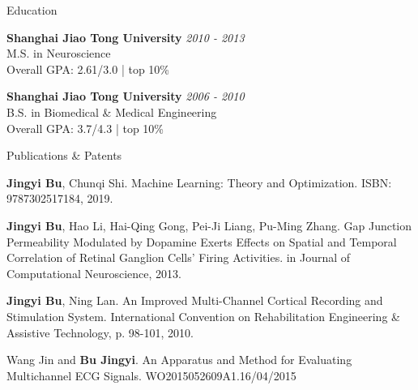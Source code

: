 \documentclass{resume} %
\begin{document}

\begin{rSection}{Education}

{\bf Shanghai Jiao Tong University} \hfill {\em 2010 - 2013} \\ 
M.S. in Neuroscience \\
Overall GPA: 2.61/3.0 | top 10\%

{\bf Shanghai Jiao Tong University} \hfill {\em 2006 - 2010} \\ 
B.S. in Biomedical \& Medical Engineering \\
Overall GPA: 3.7/4.3 | top 10\%

\end{rSection}


\begin{rSection}{Publications \& Patents}

\begin{rSubsection}{}{}{}{}
\item \textbf{Jingyi Bu}, Chunqi Shi. Machine Learning: Theory and Optimization. ISBN: 9787302517184, 2019.
\\
\item \textbf{Jingyi Bu}, Hao Li, Hai-Qing Gong, Pei-Ji Liang, Pu-Ming Zhang. Gap Junction Permeability Modulated by Dopamine Exerts Effects on Spatial and Temporal Correlation of Retinal Ganglion Cells' Firing Activities. in Journal of Computational Neuroscience, 2013.
\\
\item \textbf{Jingyi Bu}, Ning Lan. An Improved Multi-Channel Cortical Recording and Stimulation System. International Convention on Rehabilitation Engineering \& Assistive Technology, p. 98-101, 2010.
\\
\item Wang Jin and \textbf{Bu Jingyi}. An Apparatus and Method for Evaluating Multichannel ECG Signals. WO2015052609A1.16/04/2015
\end{rSubsection}

\end{rSection}
\end{document}
